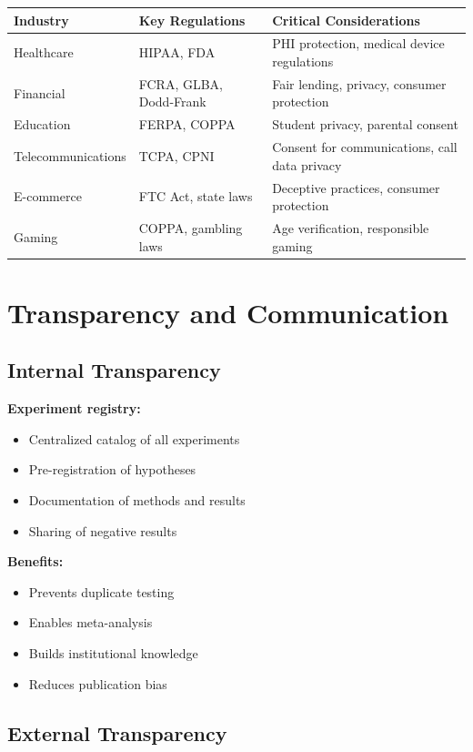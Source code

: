 \begin{center}
\begin{tabular}{lp{4cm}p{5cm}}
\toprule
\textbf{Industry} & \textbf{Key Regulations} & \textbf{Critical Considerations} \\
\midrule
Healthcare & HIPAA, FDA & PHI protection, medical device regulations \\
Financial & FCRA, GLBA, Dodd-Frank & Fair lending, privacy, consumer protection \\
Education & FERPA, COPPA & Student privacy, parental consent \\
Telecommunications & TCPA, CPNI & Consent for communications, call data privacy \\
E-commerce & FTC Act, state laws & Deceptive practices, consumer protection \\
Gaming & COPPA, gambling laws & Age verification, responsible gaming \\
\bottomrule
\end{tabular}
\end{center}

\section{Transparency and Communication}

\subsection{Internal Transparency}

\textbf{Experiment registry:}
\begin{itemize}
    \item Centralized catalog of all experiments
    \item Pre-registration of hypotheses
    \item Documentation of methods and results
    \item Sharing of negative results
\end{itemize}

\textbf{Benefits:}
\begin{itemize}
    \item Prevents duplicate testing
    \item Enables meta-analysis
    \item Builds institutional knowledge
    \item Reduces publication bias
\end{itemize}

\subsection{External Transparency}

